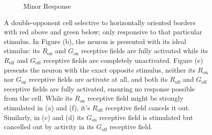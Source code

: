 \documentclass{article}
\begin{document}
\begin{figure}[h]
\begin{subfigure}{0.3\textwidth}
        \caption{Minor Response}
    \end{subfigure}
    \caption{A double-opponent cell selective to horizontally oriented borders with red above and green below; only responsive to that particular stimulus. In Figure (b), the neuron is presented with its ideal stimulus: its $R_{\text{on}}$ and $G_{\text{on}}$ receptive fields are fully activated while its $R_{\text{off}}$ and $G_{\text{off}}$ receptive fields are completely unactivated. Figure (e) presents the neuron with the exact opposite stimulus, neither its $R_{\text{on}}$ nor $G_{\text{on}}$ receptive fields are activate at all, and both its $R_{\text{off}}$ and $G_{\text{off}}$ receptive fields are fully activated, ensuring no response possible from the cell. While its $R_{\text{on}}$ receptive field might be strongly stimulated in (a) and (f), it's $R_{\text{off}}$ receptive field cancels it out. Similarly, in (c) and (d) its $G_{\text{on}}$ receptive field is stimulated but cancelled out by activity in its $G_{\text{off}}$ receptive field.}
\end{figure}
\end{document}
